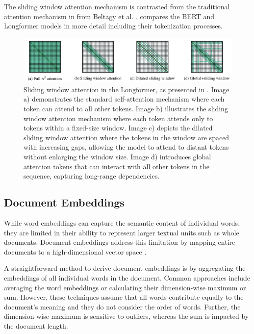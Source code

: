 The sliding window attention mechanism is contrasted from the traditional attention mechanism in  from Beltagy et al. \cite{BeltagyLongformerLongDocument2020}.
 compares the BERT and Longformer models in more detail including their tokenization processes.

\begin{figure}[ht]
    \centering
    \includegraphics[width=\textwidth]{screenshots/sliding_window_attention.png}
    \caption[Sliding Window Attention]{Sliding window attention in the Longformer, as presented in \cite{BeltagyLongformerLongDocument2020}.
        Image a) demonstrates the standard self-attention mechanism where each token can attend to all other tokens.
        Image b) illustrates the sliding window attention mechanism where each token attends only to tokens within a fixed-size window.
        Image c) depicts the dilated sliding window attention where the tokens in the window are spaced with increasing gaps, allowing the model to attend to distant tokens without enlarging the window size.
        Image d) introduces global attention tokens that can interact with all other tokens in the sequence, capturing long-range dependencies.
    }
    \label{fig:sliding-window-attention}
\end{figure}


\subsection{Document Embeddings}

While word embeddings can capture the semantic content of individual words, they are limited in their ability to represent larger textual units such as whole documents. Document embeddings address this limitation by mapping entire documents to a high-dimensional vector space \cite{PalachyDocumentEmbedding2022}.

A straightforward method to derive document embeddings is by aggregating the embeddings of all individual words in the document.
Common approaches include averaging the word embeddings or calculating their dimension-wise maximum or sum. However, these techniques assume that all words contribute equally to the document's meaning and they do not consider the order of words. Further, the dimension-wise maximum is sensitive to outliers, whereas the sum is impacted by the document length.

